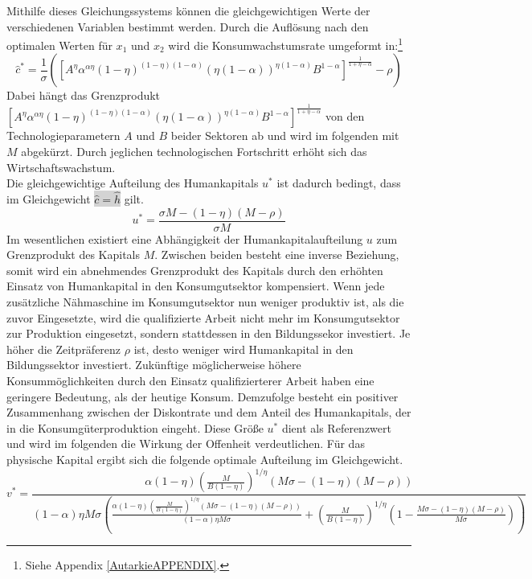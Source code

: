 Mithilfe dieses Gleichungssystems können die gleichgewichtigen Werte der verschiedenen Variablen bestimmt werden. Durch die Auflösung nach den optimalen Werten für $x_1$ und $x_2$ wird die Konsumwachstumsrate umgeformt in:\footnote{Siehe Appendix \ref{AutarkieAPPENDIX}.} 
\begin{equation}
\boxed{\hat{c}^*=\frac{1}{\sigma}\left(\left[A^\eta\alpha^{\alpha\eta}(1-\eta)^{(1-\eta)(1-\alpha)}(\eta(1-\alpha))^{\eta(1-\alpha)}B^{1-\alpha}\right]^\frac{1}{1+\eta-\alpha}-\rho\right)}
\end{equation}
Dabei hängt das Grenzprodukt $\left[A^\eta\alpha^{\alpha\eta}(1-\eta)^{(1-\eta)(1-\alpha)}(\eta(1-\alpha))^{\eta(1-\alpha)}B^{1-\alpha}\right]^\frac{1}{1+\eta-\alpha}$ von den Technologieparametern $A$ und $B$ beider Sektoren ab und wird im folgenden mit $M$ abgekürzt. Durch jeglichen technologischen Fortschritt erhöht sich das Wirtschaftswachstum.\\
Die gleichgewichtige Aufteilung des Humankapitals $u^*$ ist dadurch bedingt, dass im Gleichgewicht \colorbox{lightgray}{$\hat{c}=\hat{h}$} gilt.
\begin{equation}
\boxed{u^*=\frac{\sigma M-(1-\eta)(M-\rho)}{\sigma M}}\label{uOptAut}
\end{equation}
Im wesentlichen existiert eine Abhängigkeit der Humankapitalaufteilung $u$ zum Grenzprodukt des Kapitals $M$. Zwischen beiden besteht eine inverse Beziehung, somit wird ein abnehmendes Grenzprodukt des Kapitals durch den erhöhten Einsatz von Humankapital in den Konsumgutsektor kompensiert. Wenn jede zusätzliche Nähmaschine im Konsumgutsektor nun weniger produktiv ist, als die zuvor Eingesetzte, wird die qualifizierte Arbeit nicht mehr im Konsumgutsektor zur Produktion eingesetzt, sondern stattdessen in den Bildungssekor investiert.  Je höher die Zeitpräferenz $\rho$ ist, desto weniger wird Humankapital in den Bildungssektor investiert. Zukünftige möglicherweise höhere Konsummöglichkeiten durch den Einsatz qualifizierterer Arbeit haben eine geringere Bedeutung, als der heutige Konsum. Demzufolge besteht ein positiver Zusammenhang zwischen der Diskontrate und dem Anteil des Humankapitals, der in die Konsumgüterproduktion eingeht. Diese Grö{\ss}e $u^*$ dient als Referenzwert und wird im folgenden die Wirkung der Offenheit verdeutlichen. 
Für das physische Kapital ergibt sich die folgende optimale Aufteilung im Gleichgewicht. 
\begin{equation}
\boxed{
v^*=\frac{\alpha  (1-\eta ) \left(\frac{M}{B (1-\eta )}\right)^{1/\eta } (M \sigma -(1-\eta ) (M-\rho ))}{(1-\alpha ) \eta  M \sigma  \left(\frac{\alpha  (1-\eta ) \left(\frac{M}{B  (1-\eta )}\right)^{1/\eta } (M \sigma -(1-\eta ) (M-\rho ))}{(1-\alpha ) \eta  M \sigma }+\left(\frac{M}{B  (1-\eta )}\right)^{1/\eta } \left(1-\frac{M \sigma -(1-\eta ) (M-\rho )}{M \sigma }\right)\right)}}
\end{equation}
